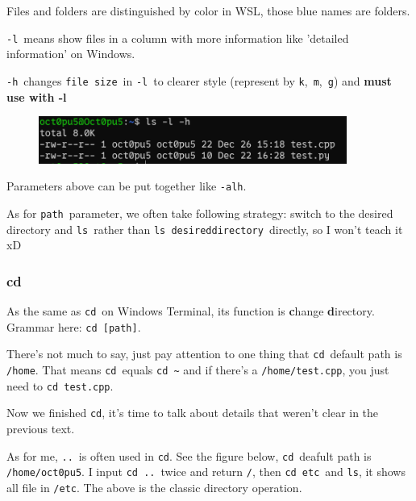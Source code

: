\documentclass[12pt]{ctexart}
\newenvironment{mdquote}
{%
  \par\noindent
  \begin{list}{}{%
      \setlength{\leftmargin}{1em}%
      \setlength{\rightmargin}{0pt}%
      \setlength{\itemindent}{0pt}%
      \setlength{\listparindent}{\parindent}%
      \setlength{\topsep}{0.5\baselineskip}%
  }
  \item[\textbf{>}\ ]\itshape
}
{\end{list}\par}
\begin{document}
\begin{mdquote}
Files and folders are distinguished by color in WSL, those blue names
are folders.
\end{mdquote}

\texttt{-l}\ means show files in a column with more information like
'detailed information' on Windows.

\texttt{-h}\ changes \texttt{file\ size}\ in \texttt{-l}\ to clearer style
(represent by \texttt{k},\ \texttt{m},\ \texttt{g}) and \textbf{must use
with -l}

\begin{figure}[H]
    \centering
    \includegraphics[width=0.9\textwidth,keepaspectratio]{assets/Linux/1.4 Linux directory structure and command/3.png}
\end{figure}

\begin{mdquote}
Parameters above can be put together like \texttt{-alh}.
\end{mdquote}

As for \texttt{path}\ parameter, we often take following strategy: switch
to the desired directory and \texttt{ls}\ rather than
\texttt{ls\ desireddirectory}\ directly, so I won't teach
it xD

\subsubsection*{\textbf{cd}}

As the same as \texttt{cd}\ on Windows Terminal, its function is
\textbf{c}hange \textbf{d}irectory. Grammar here:
\texttt{cd\ {[}path{]}}.

There's not much to say, just pay attention to one thing
that \texttt{cd}\ default path is \texttt{/home}. That means \texttt{cd}\
equals \texttt{cd\ \textasciitilde{}} and if there's a
\texttt{/home/test.cpp}, you just need to \texttt{cd\ test.cpp}.

Now we finished \texttt{cd}, it's time to talk about
details that weren't clear in the previous text.

As for me, \texttt{..}\ is often used in \texttt{cd}. See the figure
below, \texttt{cd}\ deafult path is \texttt{/home/oct0pu5}. I input
\texttt{cd\ ..}\ twice and return \texttt{/}, then \texttt{cd\ etc}\ and
\texttt{ls}, it shows all file in \texttt{/etc}. The above is the
classic directory operation.
\end{document}
